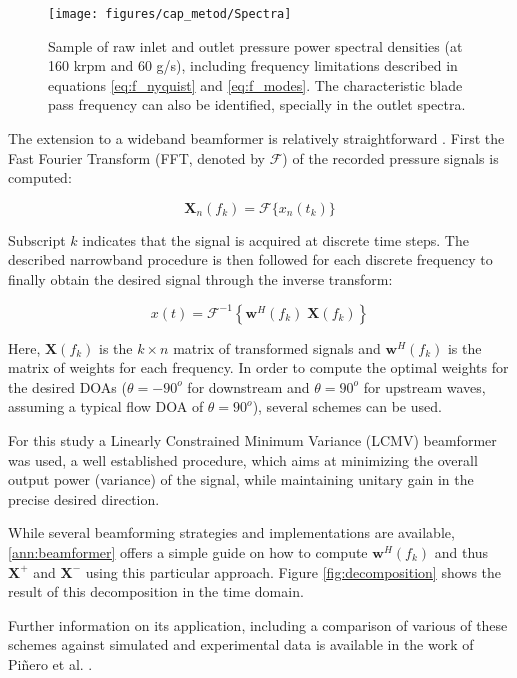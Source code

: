 \begin{figure}[t!]
\texttt{[image: figures/cap\_metod/Spectra]}
\caption{Sample of raw inlet and outlet pressure power spectral densities (at 160 krpm and 60 g/s), including frequency limitations described in equations \ref{eq:f_nyquist} and \ref{eq:f_modes}. The characteristic blade pass frequency can also be identified, specially in the outlet spectra.}
\label{fig:spectra}
\end{figure}

The extension to a wideband beamformer is relatively straightforward \cite{piper2011broadband}. First the Fast Fourier Transform (FFT, denoted by $\mathcal F$) of the recorded pressure signals is computed:

\begin{equation}
  \mathbf X_n(f_k)=\mathcal{F}\{x_n(t_k)\}
\end{equation}

Subscript $k$ indicates that the signal is acquired at discrete time steps. The described narrowband procedure is then followed for each discrete frequency to finally obtain the desired signal through the inverse transform:

\begin{equation}
    x(t)=\mathcal{F}^{-1}\left\{\mathbf w^H(f_k)\; \mathbf X(f_k)\right\}
\end{equation}

Here, $\mathbf X(f_k)$ is the $k \times n$ matrix of transformed signals and $\mathbf w^H(f_k)$ is the matrix of weights for each frequency. In order to compute the optimal weights for the desired DOAs ($\theta=-90^o$ for downstream and $\theta=90^o$ for upstream waves, assuming a typical flow DOA of $\theta=90^o$), several schemes can be used.

For this study a Linearly Constrained Minimum Variance (LCMV) beamformer was  used, a well established procedure, which aims at minimizing the overall output power (variance) of the signal, while maintaining unitary gain in the precise desired direction.

While several beamforming strategies and implementations are available, \ref{ann:beamformer} offers a simple guide on how to compute $\mathbf w^H(f_k)$ and thus $\mathbf X^+$ and $\mathbf X^-$ using this particular approach. Figure \ref{fig:decomposition} shows the result of this decomposition in the time domain.

Further information on its application, including a comparison of various of these schemes against simulated and experimental data is available in the work of Piñero et al. \cite{pinero2000estimation}.

